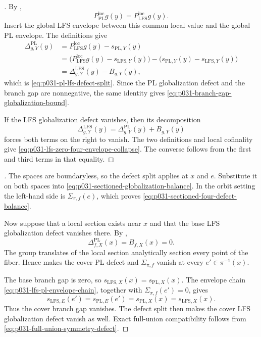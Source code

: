 \begin{proof}[]
By ,
\[
       P_{\mathrm{PL}}^{\mathrm{loc}}g(y)
          =P_{\mathrm{LFS}}^{\mathrm{loc}}g(y).
\]
Insert the global LFS envelope between this common local value and the
global PL envelope.  The definitions give
\begin{align*}
 \Delta^{\mathrm{PL}}_{g,Y}(y)
  &=P_{\mathrm{LFS}}^{\mathrm{loc}}g(y)-s_{\mathrm{PL},Y}(y)\\
  &=\bigl(
      P_{\mathrm{LFS}}^{\mathrm{loc}}g(y)-s_{\mathrm{LFS},Y}(y)
    \bigr)
    -\bigl(s_{\mathrm{PL},Y}(y)-s_{\mathrm{LFS},Y}(y)\bigr)\\
  &=\Delta^{\mathrm{LFS}}_{g,Y}(y)-B_{g,Y}(y),
\end{align*}
which is \eqref{eq:p031-pl-lfs-defect-split}.  Since the PL globalization
defect and the branch gap are nonnegative, the same identity gives
\eqref{eq:p031-branch-gap-globalization-bound}.

If the LFS globalization defect vanishes, then its decomposition
\[
       \Delta^{\mathrm{LFS}}_{g,Y}(y)
         =\Delta^{\mathrm{PL}}_{g,Y}(y)+B_{g,Y}(y)
\]
forces both terms on the right to vanish.  The two definitions and local
cofinality give \eqref{eq:p031-lfs-zero-four-envelope-collapse}.  The
converse follows from the first and third terms in that equality.
\end{proof}

\begin{proof}[]
The spaces are boundaryless, so the defect split applies at $x$ and $e$.
Substitute it on both spaces into
\eqref{eq:p031-sectioned-globalization-balance}.  In the orbit setting the
left-hand side is $\Sigma_{\pi,f}(e)$, which proves
\eqref{eq:p031-sectioned-four-defect-balance}.

Now suppose that a local section exists near $x$ and that the base LFS
globalization defect vanishes there.  By
,
\[
          \Delta^{\mathrm{PL}}_{f,X}(x)=B_{f,X}(x)=0.
\]
The group translates of the local section analytically section every point
of the fiber.  Hence
 makes the cover PL defect
and $\Sigma_{\pi,f}$ vanish at every $e'\in\pi^{-1}(x)$.

The base branch gap is zero, so
$s_{\mathrm{LFS},X}(x)=s_{\mathrm{PL},X}(x)$.  The envelope chain
\eqref{eq:p031-lfs-pl-envelope-chain}, together with
$\Sigma_{\pi,f}(e')=0$, gives
\[
 s_{\mathrm{LFS},E}(e')
   =s_{\mathrm{PL},E}(e')
   =s_{\mathrm{PL},X}(x)
   =s_{\mathrm{LFS},X}(x).
\]
Thus the cover branch gap vanishes.  The defect split then makes the cover
LFS globalization defect vanish as well.  Exact full-union compatibility
follows from \eqref{eq:p031-full-union-symmetry-defect}.
\end{proof}

